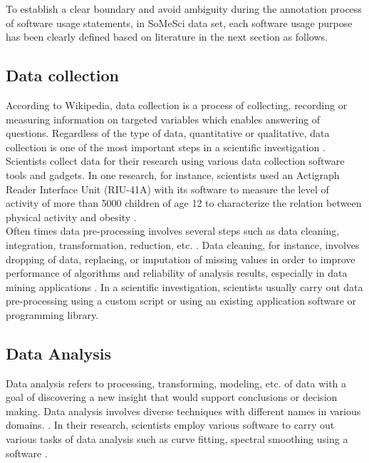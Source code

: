 To establish a clear boundary and avoid ambiguity during the annotation process of software usage statements, in \ac{SoMeSci} data set, each software usage purpose has been clearly defined based on literature in the next section as follows. 



\subsection{Data collection}
\label{sec:purpose:Types:datacollection}


According to Wikipedia, data collection is a process of collecting, recording or measuring information on targeted variables which enables answering of questions. Regardless of the type of data, quantitative or qualitative, data collection is one of the most important steps in a scientific investigation \citep{enwiki:1049936190}. \\

Scientists collect data for their research using various data collection software tools and gadgets. In one research, for instance, scientists used an Actigraph Reader Interface Unit (RIU-41A) with its software to measure the level of activity of more than 5000 children of age 12 to characterize the relation between physical activity and obesity \citep{ness2007objectively, enwiki:1046731490}. \\

Often times data pre-processing involves several steps such as data cleaning, integration, transformation, reduction, etc. \citep{malley2016data}. Data cleaning, for instance, involves dropping of data, replacing, or imputation of missing values in order to improve performance of algorithms and reliability of analysis results, especially in data mining applications \citep{enwiki:1051181443, enwiki:1056727993}. In a scientific investigation, scientists usually carry out data pre-processing using a custom script or using an existing application software or programming library. \\

\subsection{Data Analysis}
\label{sec:purpose:Types:Analysis}

Data analysis refers to processing, transforming, modeling, etc. of data with a goal of discovering a new insight that would support conclusions or decision making. Data analysis involves diverse techniques with different names in various domains. \citep{enwiki:1061024140}. In their research, scientists employ various software to carry out various tasks of data analysis such as  curve fitting, spectral smoothing using a software \citep{proctor1982data}. 

